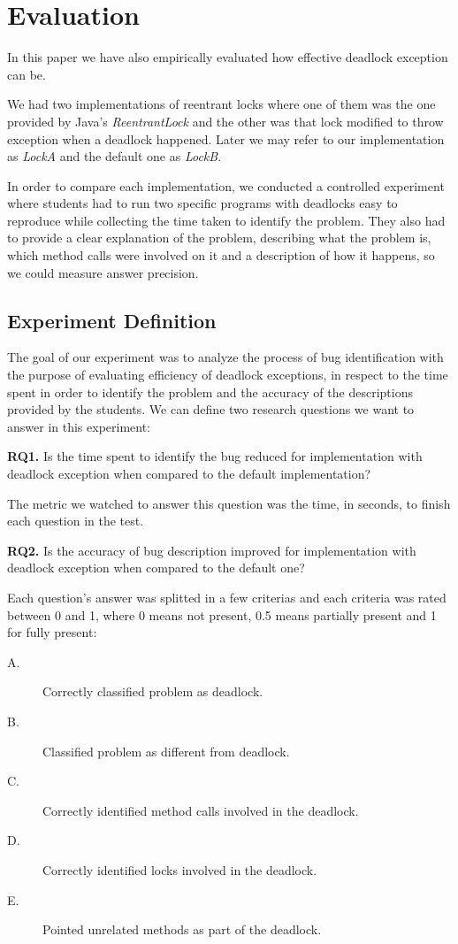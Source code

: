 \chapter{Evaluation}

In this paper we have also empirically evaluated how effective deadlock exception can be.

We had two implementations of reentrant locks where one of them was the one provided by
Java's \emph{ReentrantLock} and the other was that lock modified to throw exception when
a deadlock happened. Later we may refer to our implementation as \emph{LockA} and the default
one as \emph{LockB}.

In order to compare each implementation, we conducted
a controlled experiment where students had to run two specific programs with deadlocks
easy to reproduce while collecting the time taken to identify the problem. They also
had to provide a clear explanation of the problem, describing what the problem is, which method
calls were involved on it and a description of how it happens, so we could measure answer precision.

\section{Experiment Definition}

The goal of our experiment was to analyze the process of bug identification with the purpose of evaluating efficiency of deadlock exceptions,
in respect to the time spent in order to identify the problem and the accuracy of the descriptions provided by the students. We can define two
research questions we want to answer in this experiment:

{\bf RQ1.} Is the time spent to identify the bug reduced for implementation with deadlock exception when compared to the default implementation?

The metric we watched to answer this question was the time, in seconds, to finish each question in the test.

{\bf RQ2.} Is the accuracy of bug description improved for implementation with deadlock exception when compared to the default one?

Each question's answer was splitted in a few criterias and each criteria was rated between 0 and 1, where 0 means not present, 0.5 means partially present and 1 for fully present:

\begin{description}
\item[A.] Correctly classified problem as deadlock.
\item[B.] Classified problem as different from deadlock.
\item[C.] Correctly identified method calls involved in the deadlock.
\item[D.] Correctly identified locks involved in the deadlock. 
\item[E.] Pointed unrelated methods as part of the deadlock.
\end{description}

